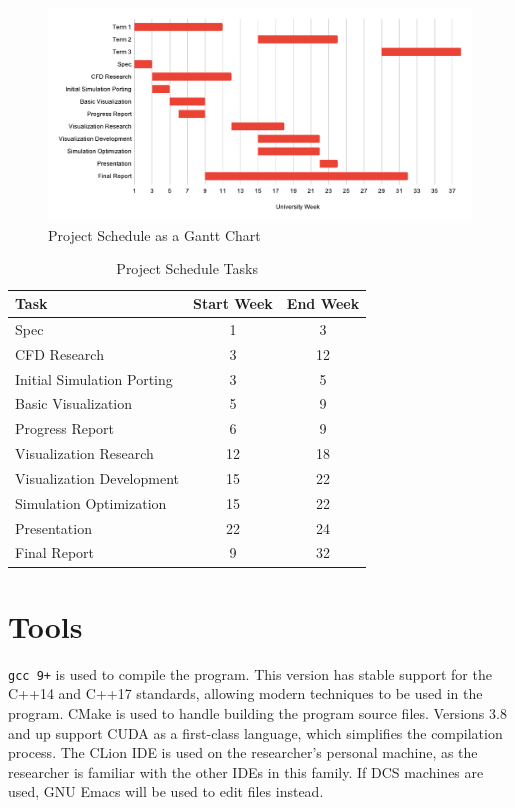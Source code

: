 \begin{figure}[ht]
    \centering
    \includegraphics[width=\linewidth]{Ch50ProjectManagement/cs311_gantt_chart.svg.pdf}
    \caption{Project Schedule as a Gantt Chart}
    \label{fig:project schedule gantt}
\end{figure}

\begin{table}[ht]
    \centering
    \begin{tabular}{l|c|c}
    \textbf{Task} & \textbf{Start Week} & \textbf{End Week} \\
    \hline
    Spec & 1 & 3 \\
    CFD Research & 3 & 12 \\
    Initial Simulation Porting & 3 & 5 \\
    Basic Visualization & 5 & 9 \\
    Progress Report & 6 & 9 \\
    Visualization Research & 12 & 18 \\
    Visualization Development & 15 & 22 \\
    Simulation Optimization & 15 & 22 \\
    Presentation & 22 & 24 \\
    Final Report & 9 & 32 \\
    \end{tabular}
    \caption{Project Schedule Tasks}
    \label{tab:project schedule table}
\end{table}

\section{Tools}
\label{sec:ProjManagementTools}
\verb|gcc 9+|\cite{tool:Gcc9} is used to compile the program.
This version has stable support for the C++14 and C++17 standards\cite{tool:GccCxxStatus}, allowing modern techniques to be used in the program.
CMake\cite{tool:Cmake} is used to handle building the program source files.
Versions 3.8 and up support CUDA as a first-class language\cite{tool:CmakeCUDAFirstClass}, which simplifies the compilation process.
The CLion IDE\cite{tool:CLion} is used on the researcher's personal machine, as the researcher is familiar with the other IDEs in this family.
If DCS machines are used, GNU Emacs\cite{tool:Emacs} will be used to edit files instead.

